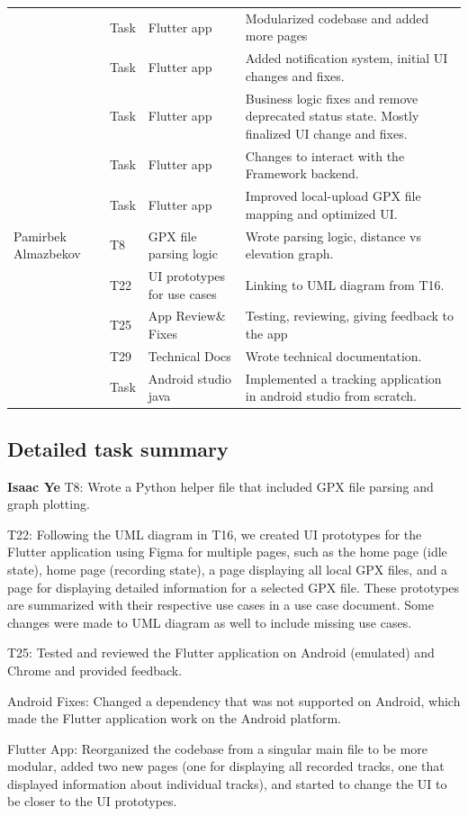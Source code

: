 \documentclass[12pt]{article}
\begin{document}
\begin{longtable}{p{3cm} p{1.5cm} p{4cm} p{7cm}}
& Task & Flutter app & Modularized codebase and added more pages \\ 
& Task & Flutter app & Added notification system, initial UI changes and fixes. \\
& Task & Flutter app & Business logic fixes and remove deprecated status state. Mostly finalized UI change and fixes.\\
& Task & Flutter app & Changes to interact with the Framework backend.\\         
& Task & Flutter app & Improved local-upload GPX file mapping and optimized UI.\\   
\midrule
Pamirbek Almazbekov & T8 & GPX file parsing logic & Wrote parsing logic, distance vs elevation graph. \\
& T22 & UI prototypes for use cases & Linking to UML diagram from T16. \\
& T25 & App Review\& Fixes & Testing, reviewing, giving feedback to the app \\
& T29 & Technical Docs & Wrote technical documentation. \\
& Task & Android studio java & Implemented a tracking application in android studio from scratch. \\

\bottomrule
\end{longtable}

\subsection*{Detailed task summary}
{\large\textbf{Isaac Ye}}
T8: Wrote a Python helper file that included GPX file parsing and graph plotting.

T22: Following the UML diagram in T16, we created UI prototypes for the Flutter application using Figma for multiple pages, such as the home page (idle state), home page (recording state), a page displaying all local GPX files, and a page for displaying detailed information for a selected GPX file. These prototypes are summarized with their respective use cases in a use case document. Some changes were made to UML diagram as well to include missing use cases.

T25: Tested and reviewed the Flutter application on Android (emulated) and Chrome and provided feedback.

Android Fixes: Changed a dependency that was not supported on Android, which made the Flutter application work on the Android platform.

Flutter App: Reorganized the codebase from a singular main file to be more modular, added two new pages (one for displaying all recorded tracks, one that displayed information about individual tracks), and started to change the UI to be closer to the UI prototypes.
\end{document}
